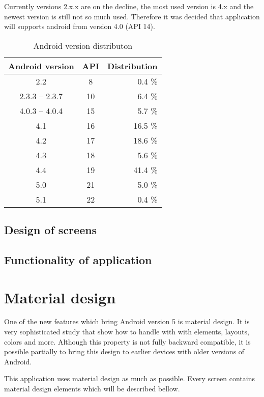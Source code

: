 Currently versions 2.x.x are on the decline, the most used version is 4.x and the newest version is still not so much used. Therefore it
was decided that application will supports android from version 4.0 (API 14).

\begin {table}[h!]
    \begin{tabular}{|c|c|r|}
        \hline
        Android version   & API   & Distribution  \\ \hline \hline
        2.2               & 8     & 0.4 \%        \\ \hline
        2.3.3 -- 2.3.7    & 10    & 6.4 \%        \\ \hline
        4.0.3 -- 4.0.4    & 15    & 5.7 \%        \\ \hline
        4.1               & 16    & 16.5 \%       \\ \hline
        4.2               & 17    & 18.6 \%       \\ \hline
        4.3               & 18    & 5.6 \%        \\ \hline
        4.4               & 19    & 41.4 \%       \\ \hline
        5.0               & 21    & 5.0 \%        \\ \hline
        5.1               & 22    & 0.4 \%        \\ \hline
    \end{tabular}
    \centering
    \caption{Android version distributon \cite{Dashboards}}
    \label{distributon}
\end{table}



\subsection{Design of screens}

\subsection{Functionality of application}

\section{Material design}
One of the new features which bring Android version 5 is material design. It is very sophisticated study that show how to handle with with elements,
layouts, colors and more. Although this property is not fully backward compatible, it is possible partially to bring this design to earlier devices
with older versions of Android.

This application uses material design as much as possible. Every screen contains material design elements which will be described bellow.

